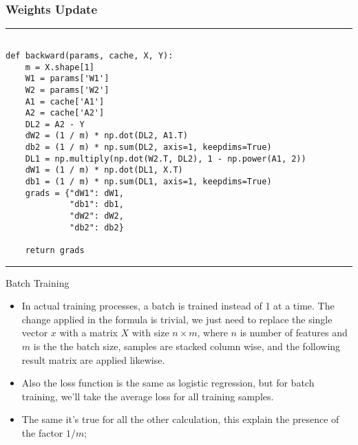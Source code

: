 \documentclass[11pt]{beamer}
\begin{document}
\begin{frame}[fragile]
\frametitle{Weights Update}
\rule{\textwidth}{1pt}
\scriptsize
\begin{verbatim}

def backward(params, cache, X, Y):
    m = X.shape[1]
    W1 = params['W1']
    W2 = params['W2']
    A1 = cache['A1']
    A2 = cache['A2']
    DL2 = A2 - Y
    dW2 = (1 / m) * np.dot(DL2, A1.T)
    db2 = (1 / m) * np.sum(DL2, axis=1, keepdims=True)
    DL1 = np.multiply(np.dot(W2.T, DL2), 1 - np.power(A1, 2))
    dW1 = (1 / m) * np.dot(DL1, X.T)
    db1 = (1 / m) * np.sum(DL1, axis=1, keepdims=True)
    grads = {"dW1": dW1,
             "db1": db1,
             "dW2": dW2,
             "db2": db2}

    return grads
\end{verbatim}
\rule{\textwidth}{1pt}
\end{frame}
\begin{frame}{Batch Training}
\begin{itemize}
\item In actual training processes, a batch is trained instead of 1 at a time. The change applied in the formula is trivial, we just need to replace the single vector $x$ with a matrix $X$ with size $n \times m$, where $n$ is number of features and $m$ is the the batch size, samples are stacked column wise, and the following result matrix are applied likewise.
\item Also the loss function is the same as logistic regression, but for batch training, we'll take the average loss for all training samples.
\item The same it's true for all the other calculation, this explain the presence of the factor $1/m$;
\end{itemize}
\end{frame}
\end{document}
